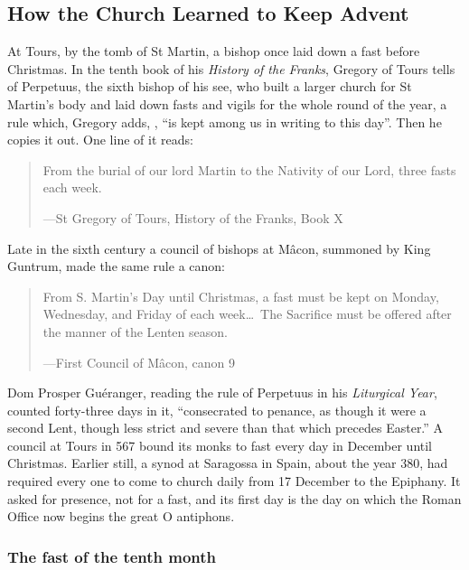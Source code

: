\subsection{How the Church Learned to Keep Advent}\label{sec:history}

At Tours, by the tomb of St Martin, a bishop once laid down a fast before
Christmas. In the tenth book of his \textit{History of the Franks}, Gregory of
Tours tells of Perpetuus, the sixth bishop of his see, who built a larger
church for St Martin's body and laid down fasts and vigils for the whole round
of the year, a rule which, Gregory adds, , ``is kept among us in writing to this day''. Then he copies it out.
One line of it reads:

\begin{quote}
From the burial of our lord Martin to the Nativity of our Lord, three fasts each
week.\par
{\smallskip\noindent\small ---St Gregory of Tours, History of the Franks, Book X\par}
\end{quote}

Late in the sixth century a council of bishops at Mâcon, summoned by King
Guntrum, made the same rule a canon:

\begin{quote}
From S. Martin's Day until Christmas, a fast must be kept on Monday,
Wednesday, and Friday of each week\dots\ The Sacrifice must be offered after
the manner of the Lenten season.\par
{\smallskip\noindent\small ---First Council of Mâcon, canon 9\par}
\end{quote}

Dom Prosper Guéranger, reading the rule of Perpetuus in his \textit{Liturgical
Year}, counted forty-three days in it, ``consecrated to penance, as though it
were a second Lent, though less strict and severe than that which precedes
Easter.'' A council at Tours in 567 bound its monks to fast every day in
December until Christmas. Earlier still, a synod at Saragossa in Spain, about
the year 380, had required every one to come to church daily from 17 December
to the Epiphany. It asked for presence, not for a fast, and its first day is
the day on which the Roman Office now begins the great O antiphons.

\subsubsection*{The fast of the tenth month}

